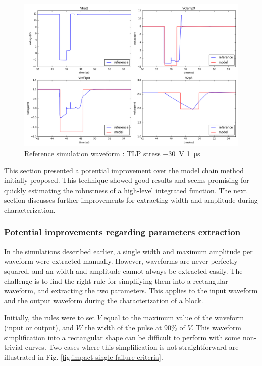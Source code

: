 \begin{figure}[!h]
  \centering
  \includegraphics[width=\textwidth]{src/4/figures/total_simulation_30V_1u_V2.png}
  \caption{Reference simulation waveform : TLP stress \SI{-30}{\volt} \SI{1}{\micro\second}}
  \label{fig:reference_simu_v2}
\end{figure}

This section presented a potential improvement over the model chain method initially proposed.
This technique showed good results and seems promising for quickly estimating the robustness of a high-level integrated function.
The next section discusses further improvements for extracting width and amplitude during characterization.

\subsubsection{Potential improvements regarding parameters extraction}

In the simulations described earlier, a single width and maximum amplitude per waveform were extracted manually.
However, waveforms are never perfectly squared, and an width and amplitude cannot always be extracted easily.
The challenge is to find the right rule for simplifying them into a rectangular waveform, and extracting the two parameters.
This applies to the input waveform and the output waveform during the characterization of a block.

Initially, the rules were to set $V$ equal to the maximum value of the waveform (input or output), and $W$ the width of the pulse at 90\% of $V$.
This waveform simplification into a rectangular shape can be difficult to perform with some non-trivial curves.
Two cases where this simplification is not straightforward are illustrated in Fig. \ref{fig:impact-single-failure-criteria}.

